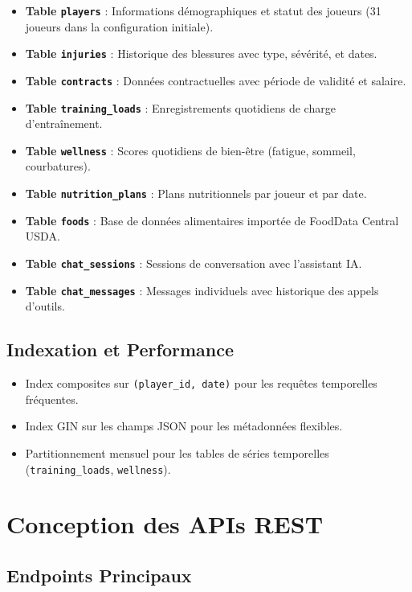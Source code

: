 \begin{itemize}
    \item \textbf{Table \texttt{players}} : Informations démographiques et statut des joueurs (31 joueurs dans la configuration initiale).
    \item \textbf{Table \texttt{injuries}} : Historique des blessures avec type, sévérité, et dates.
    \item \textbf{Table \texttt{contracts}} : Données contractuelles avec période de validité et salaire.
    \item \textbf{Table \texttt{training\_loads}} : Enregistrements quotidiens de charge d'entraînement.
    \item \textbf{Table \texttt{wellness}} : Scores quotidiens de bien-être (fatigue, sommeil, courbatures).
    \item \textbf{Table \texttt{nutrition\_plans}} : Plans nutritionnels par joueur et par date.
    \item \textbf{Table \texttt{foods}} : Base de données alimentaires importée de FoodData Central USDA.
    \item \textbf{Table \texttt{chat\_sessions}} : Sessions de conversation avec l'assistant IA.
    \item \textbf{Table \texttt{chat\_messages}} : Messages individuels avec historique des appels d'outils.
\end{itemize}

\subsection{Indexation et Performance}

\begin{itemize}
    \item Index composites sur \texttt{(player\_id, date)} pour les requêtes temporelles fréquentes.
    \item Index GIN sur les champs JSON pour les métadonnées flexibles.
    \item Partitionnement mensuel pour les tables de séries temporelles (\texttt{training\_loads}, \texttt{wellness}).
\end{itemize}

\section{Conception des APIs REST}

\subsection{Endpoints Principaux}

